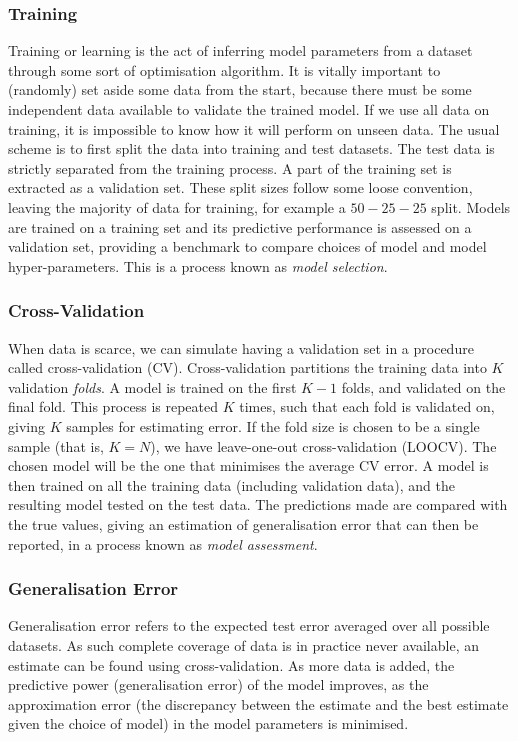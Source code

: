 \documentclass[11pt]{amsart}
\begin{document}
\subsubsection{Training} Training or learning is the act of inferring model parameters from a dataset through some sort of optimisation algorithm. It is vitally important to (randomly) set aside some data from the start, because there must be some independent data available to validate the trained model. If we use all data on training, it is impossible to know how it will perform on unseen data. The usual scheme is to first split the data into training and test datasets. The test data is strictly separated from the training process. A part of the training set is extracted as a validation set. These split sizes follow some loose convention, leaving the majority of data for training, for example a $50-25-25$ split. Models are trained on a training set and its predictive performance is assessed on a validation set, providing a benchmark to compare choices of model and model hyper-parameters. This is a process known as \emph{model selection}.\cite{htf}

\subsubsection{Cross-Validation}
When data is scarce, we can simulate having a validation set in a procedure called cross-validation (CV). Cross-validation partitions the training data into $K$ validation \emph{folds}. A model is trained on the first $K - 1$ folds, and validated on the final fold. This process is repeated $K$ times, such that each fold is validated on, giving $K$ samples for estimating error. If the fold size is chosen to be a single sample (that is, $K = N$), we have leave-one-out cross-validation (LOOCV). The chosen model will be the one that minimises the average CV error. A model is then trained on all the training data (including validation data), and the resulting model tested on the test data. The predictions made are compared with the true values, giving an estimation of generalisation error that can then be reported, in a process known as \emph{model assessment}.

\subsubsection{Generalisation Error}
Generalisation error refers to the expected test error averaged over all possible datasets. As such complete coverage of data is in practice never available, an estimate can be found using cross-validation. As more data is added, the predictive power (generalisation error) of the model improves, as the approximation error (the discrepancy between the estimate and the best estimate given the choice of model) in the model parameters is minimised.
\end{document}
